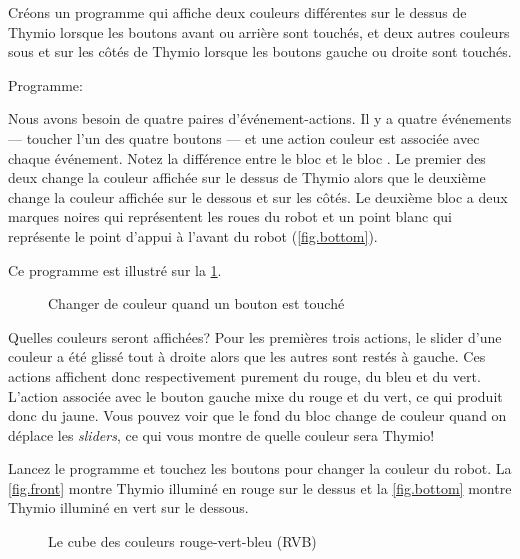 

Créons un programme qui affiche deux couleurs différentes sur le dessus de Thymio lorsque les boutons avant ou arrière sont touchés, et deux autres couleurs sous et sur les côtés de Thymio lorsque les boutons gauche ou droite sont touchés.

{\raggedleft \hfill Programme: }

Nous avons besoin de quatre paires d'événement-actions.
Il y a quatre événements --- toucher l'un des quatre boutons --- et une action couleur est associée avec chaque événement.
Notez la différence entre le bloc  et le bloc .
Le premier des deux change la couleur affichée sur le dessus de Thymio alors que le deuxième change la couleur affichée sur le dessous et sur les côtés.
Le deuxième bloc a deux marques noires qui représentent les roues du robot et un point blanc qui représente le point d'appui à l'avant du robot (\cref{fig.bottom}).

Ce programme est illustré sur la \cref{fig.colors}.

\begin{figure}
\caption{Changer de couleur quand un bouton est touché}\label{fig.colors}
\end{figure}

Quelles couleurs seront affichées?
Pour les premières trois actions, le slider d'une couleur a été glissé tout à droite alors que les autres sont restés à gauche.
Ces actions affichent donc respectivement purement du rouge, du bleu et du vert.
L'action associée avec le bouton gauche mixe du rouge et du vert, ce qui produit donc du jaune.
Vous pouvez voir que le fond du bloc change de couleur quand on déplace les \textit{sliders}, ce qui vous montre de quelle couleur sera Thymio!

Lancez le programme  et touchez les boutons pour changer la couleur du robot.
La \cref{fig.front} montre Thymio illuminé en rouge sur le dessus et la \cref{fig.bottom} montre Thymio illuminé en vert sur le dessous.



\begin{figure}
\caption{Le cube des couleurs rouge-vert-bleu (RVB)}\label{fig.cube}
\end{figure}

